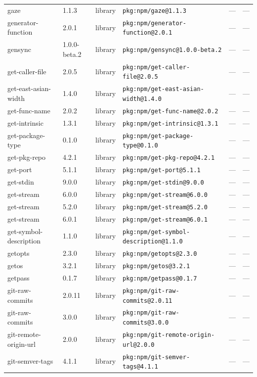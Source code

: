 \documentclass[11pt]{article}
\begin{document}
\begin{longtable}{|l|l|l|p{2.2cm}|l|p{4cm}|}
gaze & 1.1.3 & library & \texttt{pkg:npm/gaze@1.1.3} & — & — \\
generator-function & 2.0.1 & library & \texttt{pkg:npm/generator-function@2.0.1} & — & — \\
gensync & 1.0.0-beta.2 & library & \texttt{pkg:npm/gensync@1.0.0-beta.2} & — & — \\
get-caller-file & 2.0.5 & library & \texttt{pkg:npm/get-caller-file@2.0.5} & — & — \\
get-east-asian-width & 1.4.0 & library & \texttt{pkg:npm/get-east-asian-width@1.4.0} & — & — \\
get-func-name & 2.0.2 & library & \texttt{pkg:npm/get-func-name@2.0.2} & — & — \\
get-intrinsic & 1.3.1 & library & \texttt{pkg:npm/get-intrinsic@1.3.1} & — & — \\
get-package-type & 0.1.0 & library & \texttt{pkg:npm/get-package-type@0.1.0} & — & — \\
get-pkg-repo & 4.2.1 & library & \texttt{pkg:npm/get-pkg-repo@4.2.1} & — & — \\
get-port & 5.1.1 & library & \texttt{pkg:npm/get-port@5.1.1} & — & — \\
get-stdin & 9.0.0 & library & \texttt{pkg:npm/get-stdin@9.0.0} & — & — \\
get-stream & 6.0.0 & library & \texttt{pkg:npm/get-stream@6.0.0} & — & — \\
get-stream & 5.2.0 & library & \texttt{pkg:npm/get-stream@5.2.0} & — & — \\
get-stream & 6.0.1 & library & \texttt{pkg:npm/get-stream@6.0.1} & — & — \\
get-symbol-description & 1.1.0 & library & \texttt{pkg:npm/get-symbol-description@1.1.0} & — & — \\
getopts & 2.3.0 & library & \texttt{pkg:npm/getopts@2.3.0} & — & — \\
getos & 3.2.1 & library & \texttt{pkg:npm/getos@3.2.1} & — & — \\
getpass & 0.1.7 & library & \texttt{pkg:npm/getpass@0.1.7} & — & — \\
git-raw-commits & 2.0.11 & library & \texttt{pkg:npm/git-raw-commits@2.0.11} & — & — \\
git-raw-commits & 3.0.0 & library & \texttt{pkg:npm/git-raw-commits@3.0.0} & — & — \\
git-remote-origin-url & 2.0.0 & library & \texttt{pkg:npm/git-remote-origin-url@2.0.0} & — & — \\
git-semver-tags & 4.1.1 & library & \texttt{pkg:npm/git-semver-tags@4.1.1} & — & — \\

\end{longtable}
\end{document}
